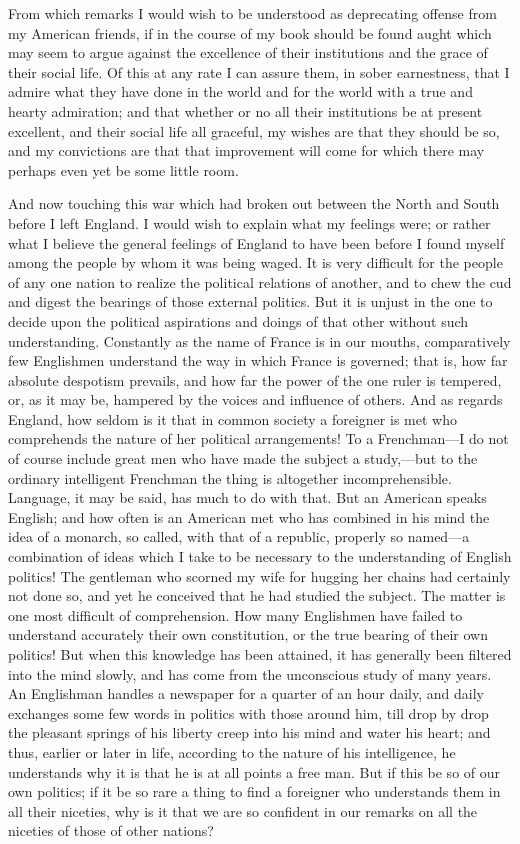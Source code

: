 From which remarks I would wish to be understood as deprecating
offense from my American friends, if in the course of my book
should be found aught which may seem to argue against the
excellence of their institutions and the grace of their social
life.  Of this at any rate I can assure them, in sober earnestness,
that I admire what they have done in the world and for the world
with a true and hearty admiration; and that whether or no all their
institutions be at present excellent, and their social life all
graceful, my wishes are that they should be so, and my convictions
are that that improvement will come for which there may perhaps
even yet be some little room.

And now touching this war which had broken out between the North
and South before I left England.  I would wish to explain what my
feelings were; or rather what I believe the general feelings of
England to have been before I found myself among the people by whom
it was being waged.  It is very difficult for the people of any one
nation to realize the political relations of another, and to chew
the cud and digest the bearings of those external politics.  But it
is unjust in the one to decide upon the political aspirations and
doings of that other without such understanding.  Constantly as the
name of France is in our mouths, comparatively few Englishmen
understand the way in which France is governed; that is, how far
absolute despotism prevails, and how far the power of the one ruler
is tempered, or, as it may be, hampered by the voices and influence
of others.  And as regards England, how seldom is it that in common
society a foreigner is met who comprehends the nature of her
political arrangements!  To a Frenchman---I do not of course include
great men who have made the subject a study,---but to the ordinary
intelligent Frenchman the thing is altogether incomprehensible.
Language, it may be said, has much to do with that.  But an
American speaks English; and how often is an American met who has
combined in his mind the idea of a monarch, so called, with that of
a republic, properly so named---a combination of ideas which I take
to be necessary to the understanding of English politics!  The
gentleman who scorned my wife for hugging her chains had certainly
not done so, and yet he conceived that he had studied the subject.
The matter is one most difficult of comprehension.  How many
Englishmen have failed to understand accurately their own
constitution, or the true bearing of their own politics!  But when
this knowledge has been attained, it has generally been filtered
into the mind slowly, and has come from the unconscious study of
many years.  An Englishman handles a newspaper for a quarter of an
hour daily, and daily exchanges some few words in politics with
those around him, till drop by drop the pleasant springs of his
liberty creep into his mind and water his heart; and thus, earlier
or later in life, according to the nature of his intelligence, he
understands why it is that he is at all points a free man.  But if
this be so of our own politics; if it be so rare a thing to find a
foreigner who understands them in all their niceties, why is it
that we are so confident in our remarks on all the niceties of
those of other nations?

